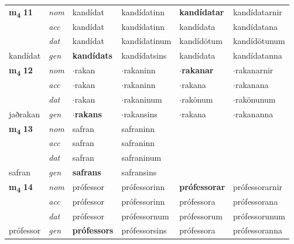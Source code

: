 \begin{longtable}[l]{llllll}
\multirow{3}{*}{{{\textbf{m{\textsubscript{4}}} \Large{\textbf{11}}}}}  & {\footnotesize{{\textit{nom}}}} & kandídat & kandídatinn    & \textbf{kandídatar} & kandídatarnir  \\*
 &  {\footnotesize{{\textit{acc}}}} & kandídat  & kandídatinn   & kandídata  & kandídatana \\*
 &  {\footnotesize{{\textit{dat}}}} & kandídat & kandídatinum   & kandídötum & kandídötunum \\*
 {\footnotesize{kandídat}} &   {\footnotesize{{\textit{gen}}}} & \textbf{kandídats}  & kandídatsins  & kandídata & kandídatanna \\
\cmidrule{1-6}


\multirow{3}{*}{{{\textbf{m{\textsubscript{4}}} \Large{\textbf{12}}}}}  & {\footnotesize{{\textit{nom}}}} & $\cdot$rakan & $\cdot$rakaninn    & \textbf{$\cdot$rakanar} & $\cdot$rakanarnir  \\*
 &  {\footnotesize{{\textit{acc}}}} & $\cdot$rakan  & $\cdot$rakaninn   & $\cdot$rakana  & $\cdot$rakanana \\*
 &  {\footnotesize{{\textit{dat}}}} & $\cdot$rakan & $\cdot$rakaninum   & $\cdot$rakönum & $\cdot$rakönunum \\*
 {\footnotesize{jaðrakan}} &   {\footnotesize{{\textit{gen}}}} & \textbf{$\cdot$rakans}  & $\cdot$rakansins  & $\cdot$rakana & $\cdot$rakananna \\
\cmidrule{1-6}


\multirow{3}{*}{{{\textbf{m{\textsubscript{4}}} \Large{\textbf{13}}}}}  & {\footnotesize{{\textit{nom}}}} & safran & safraninn    & \textbf{} &   \\*
 &  {\footnotesize{{\textit{acc}}}} & safran  & safraninn   &   &  \\*
 &  {\footnotesize{{\textit{dat}}}} & safran & safraninum   &  &  \\*
 {\footnotesize{safran}} &   {\footnotesize{{\textit{gen}}}} & \textbf{safrans}  & safransins  &  &  \\
\cmidrule{1-6}


\multirow{3}{*}{{{\textbf{m{\textsubscript{4}}} \Large{\textbf{14}}}}}  & {\footnotesize{{\textit{nom}}}} & prófessor & prófessorinn    & \textbf{prófessorar} & prófessorarnir  \\*
 &  {\footnotesize{{\textit{acc}}}} & prófessor  & prófessorinn   & prófessora  & prófessorana \\*
 &  {\footnotesize{{\textit{dat}}}} & prófessor & prófessornum   & prófessorum & prófessorunum \\*
 {\footnotesize{prófessor}} &   {\footnotesize{{\textit{gen}}}} & \textbf{prófessors}  & prófessorsins  & prófessora & prófessoranna \\
\cmidrule{1-6}



\end{longtable}
